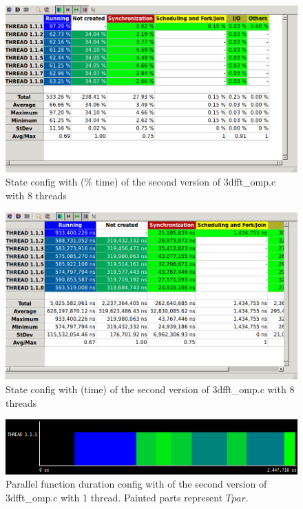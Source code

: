 \documentclass[12]{article}
\begin{document}
\begin{figure}[H]
\centering  
\includegraphics[scale=0.5]{images/improved_3dfft/8threadsPercentage.PNG}
    \caption{State config with (\% time) of the second version of 3dfft\_omp.c with 8 threads}
\end{figure}

\begin{figure}[H]
\centering  
\includegraphics[scale=0.5]{images/improved_3dfft/8threads.PNG}
    \caption{State config with (time) of the second version of 3dfft\_omp.c with 8 threads}
\end{figure}

\begin{figure}[H]
\centering  
\includegraphics[scale=0.5]{images/improved_3dfft/parallelFunction.PNG}
    \caption{Parallel function duration config with of the second version of 3dfft\_omp.c with 1 thread. Painted parts represent $T{par}$.}
    \label{fig:parFunc2}
\end{figure}
\end{document}
